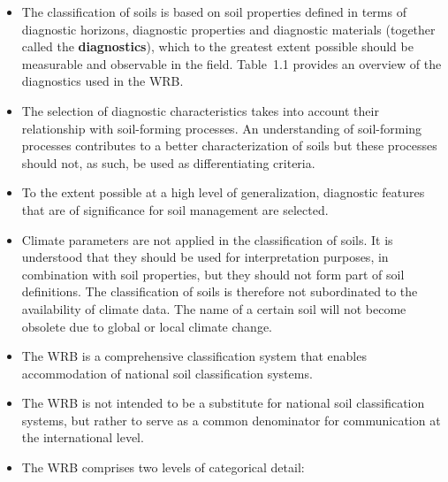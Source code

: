 \documentclass[
  letterpaper,
  DIV=11,
  numbers=noendperiod]{scrreprt}
\providecommand{\tightlist}{%
  \setlength{\itemsep}{0pt}\setlength{\parskip}{0pt}}\usepackage{longtable,booktabs,array}
\begin{document}
\begin{itemize}
\tightlist
\item
  The classification of soils is based on soil properties defined in
  terms of diagnostic horizons, diagnostic properties and diagnostic
  materials (together called the \textbf{diagnostics}), which to the
  greatest extent possible should be measurable and observable in the
  field. Table~1.1 provides an overview of the diagnostics used in the
  WRB.
\item
  The selection of diagnostic characteristics takes into account their
  relationship with soil-forming processes. An understanding of
  soil-forming processes contributes to a better characterization of
  soils but these processes should not, as such, be used as
  differentiating criteria.
\item
  To the extent possible at a high level of generalization, diagnostic
  features that are of significance for soil management are selected.
\item
  Climate parameters are not applied in the classification of soils. It
  is understood that they should be used for interpretation purposes, in
  combination with soil properties, but they should not form part of
  soil definitions. The classification of soils is therefore not
  subordinated to the availability of climate data. The name of a
  certain soil will not become obsolete due to global or local climate
  change.
\item
  The WRB is a comprehensive classification system that enables
  accommodation of national soil classification systems.
\item
  The WRB is not intended to be a substitute for national soil
  classification systems, but rather to serve as a common denominator
  for communication at the international level.
\item
  The WRB comprises two levels of categorical detail:


\end{itemize}
\end{document}
